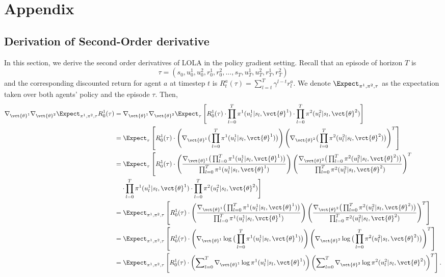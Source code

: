 \onecolumn
\section{Appendix}
\label{sec:appendix}
\subsection{Derivation of Second-Order derivative}
\label{sec:derive}
In this section, we derive the second order derivatives of LOLA in the policy gradient setting. Recall that an episode of horizon $T$ is 
\begin{equation*}
\tau = (s_0, u^1_0, u^2_0, r^1_0, r^2_0, ..., s_{T}, u^1_{T}, u^2_{T}, r^1_{T}, r^2_{T})
\end{equation*}
and the corresponding discounted return for agent $a$ at timestep $t$ is $R^a_t(\tau) = \sum\nolimits_{l=t}^{T} \gamma^{l-t} r^a_{l}$. We denote $\Expect_{\pi^1, \pi^2, \tau}$ as the expectation taken over both agents' policy and the episode $\tau$. Then,
\begin{align*}
\nabla_{\vct{\theta}^1}\nabla_{\vct{\theta}^2}\Expect_{\pi^1, \pi^2, \tau} R^1_0(\tau) &= \nabla_{\vct{\theta}^1}\nabla_{\vct{\theta}^2} \Expect_{\tau} \left[ R^1_0(\tau) \cdot \prod_{l=0}^{T} \pi^1(u^1_l| s_l, \vct{\theta}^1) \cdot \prod_{l=0}^{T} \pi^2(u^2_l | s_l, \vct{\theta}^2) \right] \\
& =   \Expect_{\tau} \left[ R^1_0(\tau) \cdot \left( \nabla_{\vct{\theta}^1} \big(\prod_{l=0}^{T}  \pi^1(u^1_l| s_l, \vct{\theta}^1) \big) \right) \left( \nabla_{\vct{\theta}^2} \big( \prod_{l=0}^{T} \pi^2(u^2_l | s_l, \vct{\theta}^2)\big) \right)^T \right] \\
& = \Expect_{\tau} \left[ R^1_0(\tau) \cdot \left( \frac{\nabla_{\vct{\theta}^1} \big( \prod_{l=0}^{T}  \pi^1(u^1_l| s_l, \vct{\theta}^1)\big)}{\prod_{l=0}^{T}  \pi^1(u^1_l| s_l, \vct{\theta}^1)} \right) \left( \frac{\nabla_{\vct{\theta}^2}\big(\prod_{l=0}^{T} \pi^2(u^2_l | s_l, \vct{\theta}^2)\big)}{\prod_{l=0}^{T} \pi^2(u^2_l | s_l, \vct{\theta}^2)} \right)^T  \right. \\
& \left. \quad \cdot \prod_{l=0}^{T}  \pi^1(u^1_l| s_l, \vct{\theta}^1)  \cdot  \prod_{l=0}^{T} \pi^2(u^2_l | s_l, \vct{\theta}^2)\right] \\
& = \Expect_{\pi^1, \pi^2, \tau} \left[ R^1_0(\tau) \cdot \left(\frac{\nabla_{\vct{\theta}^1} \big( \prod_{l=0}^{T}  \pi^1(u^1_l| s_l, \vct{\theta}^1)\big)}{\prod_{l=0}^{T}  \pi^1(u^1_l| s_l, \vct{\theta}^1)} \right) \left( \frac{\nabla_{\vct{\theta}^2}\big(\prod_{l=0}^{T} \pi^2(u^2_l | s_l, \vct{\theta}^2)\big)}{\prod_{l=0}^{T} \pi^2(u^2_l | s_l, \vct{\theta}^2)} \right)^T  \right]\\
& = \Expect_{\pi^1, \pi^2, \tau} \left[ R^1_0(\tau) \cdot \left(\nabla_{\vct{\theta}^1} \log\big( \prod_{l=0}^{T}  \pi^1(u^1_l| s_l, \vct{\theta}^1)\big) \right) \left( \nabla_{\vct{\theta}^2}\log\big(\prod_{l=0}^{T} \pi^2(u^2_l | s_l, \vct{\theta}^2)\big)\right)^T  \right] \\
& = \Expect_{\pi^1, \pi^2, \tau} \left[ R^1_0(\tau) \cdot \left(\sum\nolimits_{l=0}^{T} \nabla_{\vct{\theta}^1} \log \pi^1(u^1_l|s_l, \vct{\theta}^1) \right)  \left( \sum\nolimits_{l=0}^{T} \nabla_{\vct{\theta}^2} \log \pi^2(u^2_l|s_l, \vct{\theta}^2) \right)^T \right].
\end{align*}

